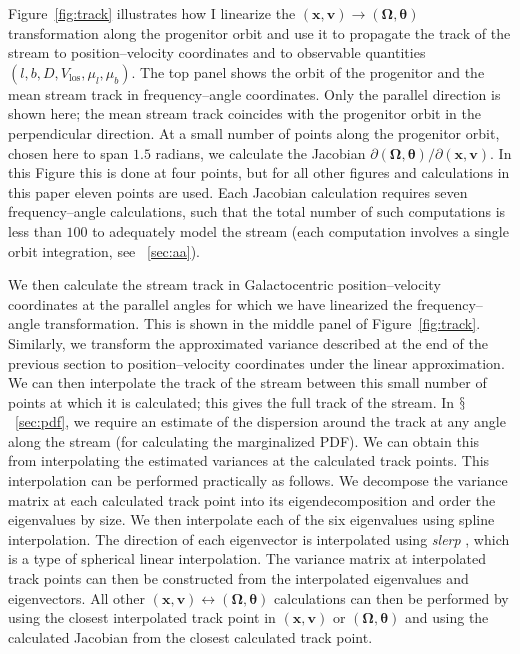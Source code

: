 \documentclass[12pt,preprint]{aastex}
\renewcommand{\figurename}{Figure}
\newcommand{\sectionname}{$\mathsection$}
\renewcommand{\vec}[1]{\ensuremath{\mathbf{#1}}}
\newcommand{\vecx}{\ensuremath{\vec{x}}}
\newcommand{\vecv}{\ensuremath{\vec{v}}}
\newcommand{\veco}{\ensuremath{\vec{\Omega}}}
\newcommand{\veca}{\ensuremath{\boldsymbol\theta}}
\newcommand{\vlos}{\ensuremath{V_{\mathrm{los}}}}
\newcommand{\pmll}{\ensuremath{\mu_l}}
\newcommand{\pmbb}{\ensuremath{\mu_b}}
\begin{document}
\figurename~\ref{fig:track} illustrates how I linearize the
$(\vecx,\vecv) \rightarrow (\veco,\veca)$ transformation along the
progenitor orbit and use it to propagate the track of the stream to
position--velocity coordinates and to observable quantities
$(l,b,D,\vlos,\pmll,\pmbb)$. The top panel shows the orbit of the
progenitor and the mean stream track in frequency--angle
coordinates. Only the parallel direction is shown here; the mean
stream track coincides with the progenitor orbit in the perpendicular
direction. At a small number of points along the progenitor orbit,
chosen here to span $1.5$ radians, we calculate the Jacobian $\partial
(\veco,\veca) / \partial (\vecx,\vecv)$. In this Figure this is done
at four points, but for all other figures and calculations in this
paper eleven points are used. Each Jacobian calculation requires seven
frequency--angle calculations, such that the total number of such
computations is less than $100$ to adequately model the stream (each
computation involves a single orbit integration, see
\appendixname~\ref{sec:aa}). 

We then calculate the stream track in Galactocentric
position--velocity coordinates at the parallel angles for which we
have linearized the frequency--angle transformation. This is shown in
the middle panel of \figurename~\ref{fig:track}. Similarly, we
transform the approximated variance described at the end of the
previous section to position--velocity coordinates under the linear
approximation. We can then interpolate the track of the stream between
this small number of points at which it is calculated; this gives the
full track of the stream. In \sectionname~\ref{sec:pdf}, we require an
estimate of the dispersion around the track at any angle along the
stream (for calculating the marginalized PDF). We can obtain this from
interpolating the estimated variances at the calculated track
points. This interpolation can be performed practically as follows. We
decompose the variance matrix at each calculated track point into its
eigendecomposition and order the eigenvalues by size. We then
interpolate each of the six eigenvalues using spline
interpolation. The direction of each eigenvector is interpolated using
\emph{slerp} \citep{Shoemake85a}, which is a type of spherical linear
interpolation. The variance matrix at interpolated track points can
then be constructed from the interpolated eigenvalues and
eigenvectors. All other $(\vecx,\vecv) \leftrightarrow (\veco,\veca)$
calculations can then be performed by using the closest interpolated
track point in $(\vecx,\vecv)$ or $(\veco,\veca)$ and using the
calculated Jacobian from the closest calculated track point.
\end{document}
